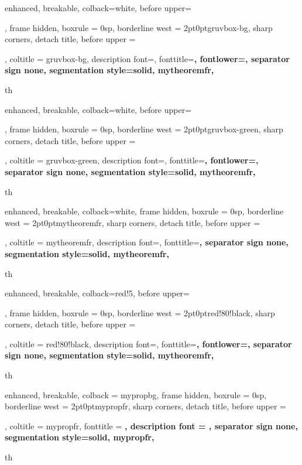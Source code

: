 {
	enhanced,
	breakable,
	colback=white,
  before upper=\tcbtitle\par\Hugeskip,
	frame hidden,
	boxrule = 0sp,
	borderline west = {2pt}{0pt}{gruvbox-bg},
	sharp corners,
	detach title,
	before upper = \tcbtitle\par\smallskip,
	coltitle = gruvbox-bg,
	description font=\mdseries{}\selectfont,
	fonttitle=\selectfont\bfseries,
	fontlower=\selectfont,
  separator sign none,
	segmentation style={solid, mytheoremfr},
}
{th}

{
	enhanced,
	breakable,
	colback=white,
  before upper=\tcbtitle\par\Hugeskip,
	frame hidden,
	boxrule = 0sp,
	borderline west = {2pt}{0pt}{gruvbox-green},
	sharp corners,
	detach title,
	before upper = \tcbtitle\par\smallskip,
	coltitle = gruvbox-green,
	description font=\mdseries{}\selectfont,
	fonttitle=\selectfont\bfseries,
	fontlower=\selectfont,
  separator sign none,
	segmentation style={solid, mytheoremfr},
}
{th}

{
	enhanced,
	breakable,
	colback=white,
	frame hidden,
	boxrule = 0sp,
	borderline west = {2pt}{0pt}{mytheoremfr},
	sharp corners,
	detach title,
	before upper = \tcbtitle\par\smallskip,
	coltitle = mytheoremfr,
	description font=\selectfont,
	fonttitle=\selectfont\bfseries,
	separator sign none,
	segmentation style={solid, mytheoremfr},
}
{th}

{
enhanced,
breakable,
colback=red!5,
  before upper=\tcbtitle\par\Hugeskip,
frame hidden,
boxrule = 0sp,
borderline west = {2pt}{0pt}{red!80!black},
sharp corners,
detach title,
before upper = \tcbtitle\par\smallskip,
coltitle = red!80!black,
description font=\mdseries{}\selectfont,
fonttitle=\selectfont\bfseries,
fontlower=\selectfont,
  separator sign none,
segmentation style={solid, mytheoremfr},
}
{th}

{%
	enhanced,
	breakable,
	colback = mypropbg,
	frame hidden,
	boxrule = 0sp,
	borderline west = {2pt}{0pt}{mypropfr},
	sharp corners,
	detach title,
	before upper = \tcbtitle\par\smallskip,
	coltitle = mypropfr,
	fonttitle = \bfseries\sffamily,
	description font = \mdseries,
	separator sign none,
	segmentation style={solid, mypropfr},
}
{th}


